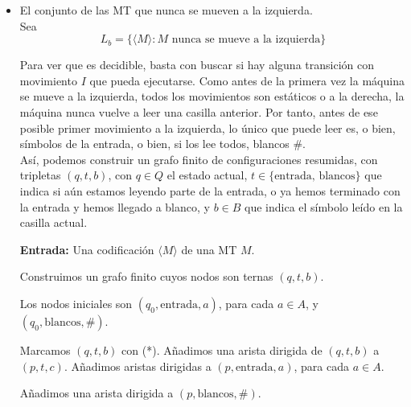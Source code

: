\begin{ejercicio}
\begin{itemize}
        

        \item[b)] El conjunto de las MT que nunca se mueven a la izquierda. \\
        
        Sea 
        $$L_b = \{\langle M \rangle : M \text{ nunca se mueve a la izquierda}\}$$

        Para ver que es decidible, basta con buscar si hay alguna transición con movimiento $I$ que pueda ejecutarse.
        Como antes de la primera vez la máquina se mueve a la izquierda, todos los movimientos son estáticos o a la derecha,
        la máquina nunca vuelve a leer una casilla anterior. Por tanto, antes de ese posible primer movimiento a la izquierda,
        lo único que puede leer es, o bien, símbolos de la entrada, o bien, si los lee todos, blancos \#. \\

        Así, podemos construir un grafo finito de configuraciones resumidas, con tripletas $(q,t, b)$, con $q \in Q$ el estado 
        actual, $t \in \{\text{entrada, blancos}\}$ que indica si aún estamos leyendo parte de la entrada, o ya hemos
        terminado con la entrada y hemos llegado a blanco, y $b \in B$ que indica el símbolo leído en la casilla actual. \\

        \begin{algorithm}
            \caption{Decisor para $L_b$}
            \begin{algorithmic}
                \State \textbf{Entrada:} Una codificación $\langle M\rangle$ de una MT $M$.

                \State Construimos un grafo finito cuyos nodos son ternas $(q,t,b)$.

                \State Los nodos iniciales son $(q_0,\text{entrada},a)$, para cada $a\in A$, y $(q_0,\text{blancos},\#)$.

                        \State Marcamos $(q,t,b)$ con (*).
                        \State Añadimos una arista dirigida de $(q,t,b)$ a $(p,t,c)$.
                            \State Añadimos aristas dirigidas a $(p,\text{entrada},a)$, para cada $a\in A$.
                        \EndIf
                        
                        \State Añadimos una arista dirigida a $(p,\text{blancos},\#)$.
                    \EndIf
                \EndFor


\end{algorithmic}
\end{algorithm}
\end{itemize}
\end{ejercicio}
